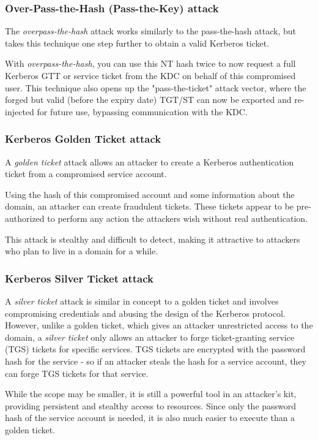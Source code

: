 \subsubsection{Over-Pass-the-Hash (Pass-the-Key) attack}
The \textit{overpass-the-hash} attack works similarly to the pass-the-hash attack, but takes this technique one step further to obtain a valid Kerberos ticket.

With \textit{overpass-the-hash}, you can use this NT hash twice to now request a full Kerberos GTT or service ticket from the KDC on behalf of this compromised user. This technique also opens up the "pass-the-ticket" attack vector, where the forged but valid (before the expiry date) TGT/ST can now be exported and re-injected for future use, bypassing communication with the KDC.

\subsubsection{Kerberos Golden Ticket attack}
A \textit{golden ticket} attack allows an attacker to create a Kerberos authentication ticket from a compromised service account.

Using the hash of this compromised account and some information about the domain, an attacker can create fraudulent tickets. These tickets appear to be pre-authorized to perform any action the attackers wish without real authentication.

This attack is stealthy and difficult to detect, making it attractive to attackers who plan to live in a domain for a while.

\subsubsection{Kerberos Silver Ticket attack}
A \textit{silver ticket} attack is similar in concept to a golden ticket and involves compromising credentials and abusing the design of the Kerberos protocol. However, unlike a golden ticket, which gives an attacker unrestricted access to the domain, a \textit{silver ticket} only allows an attacker to forge ticket-granting service (TGS) tickets for specific services. TGS tickets are encrypted with the password hash for the service - so if an attacker steals the hash for a service account, they can forge TGS tickets for that service.

While the scope may be smaller, it is still a powerful tool in an attacker's kit, providing persistent and stealthy access to resources. Since only the password hash of the service account is needed, it is also much easier to execute than a golden ticket.

